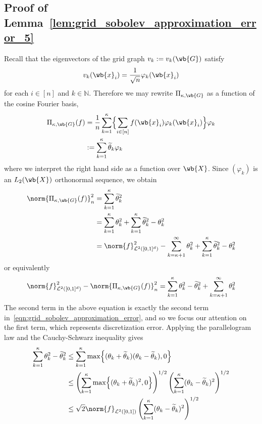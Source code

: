 \documentclass{article}
\newcommand{\1}{\mathbf{1}}
\newcommand{\Leb}{\mathcal{L}}
\newcommand{\wt}[1]{\widetilde{#1}}
\theoremstyle{alden}
\theoremstyle{aldenthm}
\theoremstyle{definition}
\theoremstyle{remark}
\begin{document}
\subsection{Proof of Lemma~\ref{lem:grid_sobolev_approximation_error_5}}
Recall that the eigenvectors of the grid graph $v_k := v_k(\wb{G})$ satisfy
\begin{equation*}
v_{k}(\wb{x}_i) = \frac{1}{\sqrt{n}} \varphi_{k}(\wb{x}_i)
\end{equation*}
for each $i \in [n]$ and $k \in \mathbb{N}$. Therefore we may rewrite $\Pi_{\kappa,\wb{G}}$ as a function of the cosine Fourier basis,
\begin{align*}
\Pi_{\kappa,\wb{G}}(f) & = \frac{1}{n} \sum_{k = 1}^{\kappa} \Bigl\{\sum_{i \in [n]} f(\wb{x}_i) \varphi_k(\wb{x}_i)\Bigr\} \varphi_k \\
& :=  \sum_{k = 1}^{\kappa} \wt{\theta}_k \varphi_k
\end{align*}
where we interpret the right hand side as a function over $\wb{X}$. Since $(\varphi_k)$ is an $L_2(\wb{X})$ orthonormal sequence, we obtain
\begin{align*}
\norm{\Pi_{\kappa,\wb{G}}(f)}_n^2 & = \sum_{k = 1}^{\kappa} \wt{\theta}_k^2 \\ 
& = \sum_{k = 1}^{\kappa} {\theta}_k^2 + \sum_{k = 1}^{\kappa} \wt{\theta}_k^2 - \theta_k^2 \\
& = \norm{f}_{\Leb^2([0,1]^d)}^2 - \sum_{k = \kappa + 1}^{\infty} \theta_k^2 + \sum_{k = 1}^{\kappa} \wt{\theta}_k^2 - \theta_k^2
\end{align*}
or equivalently
\begin{equation*}
\norm{f}_{\Leb^2([0,1]^d)}^2 - \norm{\Pi_{\kappa,\wb{G}}(f)}_n^2 = \sum_{k = 1}^{\kappa} \theta_k^2 - \wt{\theta}_k^2 + \sum_{k = \kappa + 1}^{\infty} \theta_k^2
\end{equation*}
The second term in the above equation is exactly the second term in~\eqref{eqn:grid_sobolev_approximation_error}, and so we focus our attention on the first term, which represents discretization error. Applying the parallelogram law and the Cauchy-Schwarz inequality gives
\begin{equation}
\label{eqn:grid_sobolev_approximation_error5_pf2}
\begin{aligned}
\sum_{k = 1}^{\kappa} \theta_k^2 - \wt{\theta}_k^2 & \leq \sum_{k = 1}^{\kappa} \max\Bigl\{(\theta_k + \wt{\theta}_k)(\theta_k - \wt{\theta}_k),0\Bigr\} \\
& \leq \left(\sum_{k = 1}^{\kappa} \max\Bigl\{(\theta_k + \wt{\theta}_k)^2,0\Bigr\}\right)^{1/2} \left(\sum_{k = 1}^{\kappa} (\theta_k - \wt{\theta}_k)^2\right)^{1/2} \\
& \leq \sqrt{2} \norm{f}_{\Leb^2([0,1])} \left(\sum_{k = 1}^{\kappa} (\theta_k - \wt{\theta}_k)^2\right)^{1/2}
\end{aligned}
\end{equation}
\end{document}
